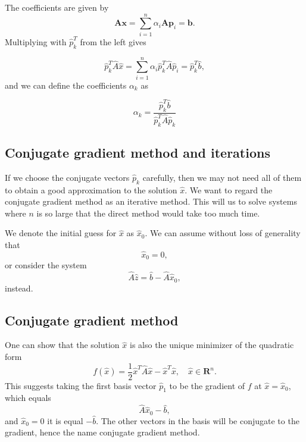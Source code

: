 \documentclass[%
oneside,                 %
final,                   %
10pt]{article}
\begin{document}
The coefficients are given by
\begin{equation*}
    \mathbf{A}\mathbf{x} = \sum^{n}_{i=1} \alpha_i \mathbf{A} \mathbf{p}_i = \mathbf{b}.
\end{equation*}
Multiplying with $\hat{p}_k^T$  from the left gives

\begin{equation*}
  \hat{p}_k^T \hat{A}\hat{x} = \sum^{n}_{i=1} \alpha_i\hat{p}_k^T \hat{A}\hat{p}_i= \hat{p}_k^T \hat{b},
\end{equation*}
and we can define the coefficients $\alpha_k$ as

\begin{equation*}
    \alpha_k = \frac{\hat{p}_k^T \hat{b}}{\hat{p}_k^T \hat{A} \hat{p}_k}
\end{equation*}

\subsection*{Conjugate gradient method and iterations}

If we choose the conjugate vectors $\hat{p}_k$ carefully, 
then we may not need all of them to obtain a good approximation to the solution 
$\hat{x}$. 
We want to regard the conjugate gradient method as an iterative method. 
This will us to solve systems where $n$ is so large that the direct 
method would take too much time.

We denote the initial guess for $\hat{x}$ as $\hat{x}_0$. 
We can assume without loss of generality that
\begin{equation*}
\hat{x}_0=0,
\end{equation*}
or consider the system
\begin{equation*}
\hat{A}\hat{z} = \hat{b}-\hat{A}\hat{x}_0,
\end{equation*}
instead.

\subsection*{Conjugate gradient method}

One can show that the solution $\hat{x}$ is also the unique minimizer of the quadratic form
\begin{equation*}
  f(\hat{x}) = \frac{1}{2}\hat{x}^T\hat{A}\hat{x} - \hat{x}^T \hat{x} , \quad \hat{x}\in\mathbf{R}^n. 
\end{equation*}
This suggests taking the first basis vector $\hat{p}_1$ 
to be the gradient of $f$ at $\hat{x}=\hat{x}_0$, 
which equals
\begin{equation*}
\hat{A}\hat{x}_0-\hat{b},
\end{equation*}
and 
$\hat{x}_0=0$ it is equal $-\hat{b}$.
The other vectors in the basis will be conjugate to the gradient, 
hence the name conjugate gradient method.
\end{document}
